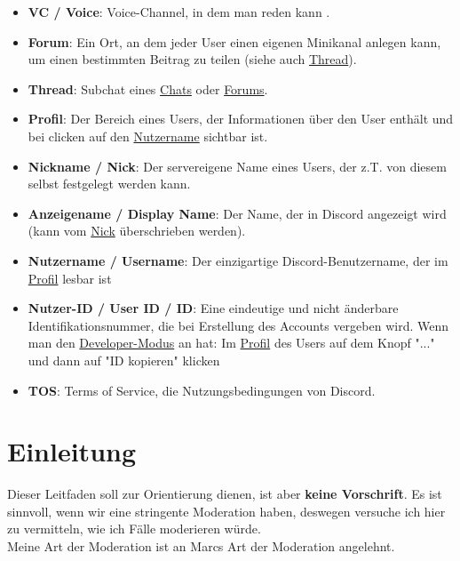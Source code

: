 \documentclass[a4paper,12pt]{article}
\begin{document}
\begin{itemize}
    \item \textbf{VC / Voice}\hypertarget{term:vc}{}: Voice-Channel, in dem man reden kann .
    \item \textbf{Forum}\hypertarget{term:forum}{}: Ein Ort, an dem jeder User einen eigenen Minikanal anlegen kann, um einen bestimmten Beitrag zu teilen (siehe auch \hyperlink{term:thread}{Thread}).
    \item \textbf{Thread}\hypertarget{term:thread}{}: Subchat eines \hyperlink{term:chat}{Chats} oder \hyperlink{term:forum}{Forums}.
    \item \textbf{Profil}\hypertarget{term:profile}{}: Der Bereich eines Users, der Informationen über den User enthält und bei clicken auf den \hyperlink{term:username}{Nutzername} sichtbar ist.
    \item \textbf{Nickname / Nick}\hypertarget{term:nick}{}: Der servereigene Name eines Users, der z.T. von diesem selbst festgelegt werden kann.
    \item \textbf{Anzeigename / Display Name}\hypertarget{term:displayname}{}: Der Name, der in Discord angezeigt wird (kann vom \hyperlink{term:nick}{Nick} überschrieben werden).
    \item \textbf{Nutzername / Username}\hypertarget{term:username}{}: Der einzigartige Discord-Benutzername, der im \hyperlink{term:profile}{Profil} lesbar ist
    \item \textbf{Nutzer-ID / User ID / ID}\hypertarget{term:id}{}: Eine eindeutige und nicht änderbare Identifikationsnummer, die bei Erstellung des Accounts vergeben wird. Wenn man den \href{https://www.howtogeek.com/714348/how-to-enable-or-disable-developer-mode-on-discord/}{Developer-Modus} an hat: Im \hyperlink{term:profile}{Profil} des Users auf dem Knopf "..." und dann auf "ID kopieren" klicken
    \item \textbf{TOS}\hypertarget{term:tos}{}: Terms of Service, die Nutzungsbedingungen von Discord.
\end{itemize}

\section{Einleitung}
Dieser Leitfaden soll zur Orientierung dienen, ist aber \textbf{keine Vorschrift}. Es ist sinnvoll, wenn wir
eine stringente Moderation haben, deswegen versuche ich hier zu vermitteln, wie ich Fälle moderieren würde.\\
Meine Art der Moderation ist an Marcs Art der Moderation angelehnt.
\end{document}
